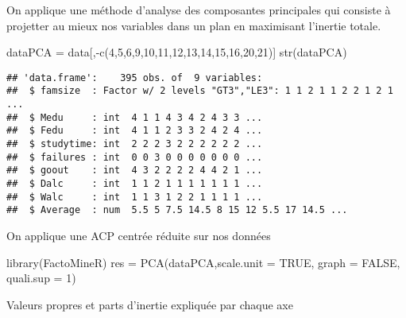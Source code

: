 \documentclass[
]{article}
\newenvironment{Shaded}{\begin{snugshade}}{\end{snugshade}}
\newcommand{\AttributeTok}[1]{\textcolor[rgb]{0.77,0.63,0.00}{#1}}
\newcommand{\ConstantTok}[1]{\textcolor[rgb]{0.00,0.00,0.00}{#1}}
\newcommand{\DecValTok}[1]{\textcolor[rgb]{0.00,0.00,0.81}{#1}}
\newcommand{\FunctionTok}[1]{\textcolor[rgb]{0.00,0.00,0.00}{#1}}
\newcommand{\NormalTok}[1]{#1}
\newcommand{\OtherTok}[1]{\textcolor[rgb]{0.56,0.35,0.01}{#1}}
\newcommand{\SpecialCharTok}[1]{\textcolor[rgb]{0.00,0.00,0.00}{#1}}
\begin{document}
On applique une méthode d'analyse des composantes principales qui
consiste à projetter au mieux nos variables dans un plan en maximisant
l'inertie totale.

\begin{Shaded}
\begin{Highlighting}[]
\NormalTok{dataPCA }\OtherTok{=}\NormalTok{ data[,}\SpecialCharTok{{-}}\FunctionTok{c}\NormalTok{(}\DecValTok{4}\NormalTok{,}\DecValTok{5}\NormalTok{,}\DecValTok{6}\NormalTok{,}\DecValTok{9}\NormalTok{,}\DecValTok{10}\NormalTok{,}\DecValTok{11}\NormalTok{,}\DecValTok{12}\NormalTok{,}\DecValTok{13}\NormalTok{,}\DecValTok{14}\NormalTok{,}\DecValTok{15}\NormalTok{,}\DecValTok{16}\NormalTok{,}\DecValTok{20}\NormalTok{,}\DecValTok{21}\NormalTok{)]}
\FunctionTok{str}\NormalTok{(dataPCA)}
\end{Highlighting}
\end{Shaded}

\begin{verbatim}
## 'data.frame':    395 obs. of  9 variables:
##  $ famsize  : Factor w/ 2 levels "GT3","LE3": 1 1 2 1 1 2 2 1 2 1 ...
##  $ Medu     : int  4 1 1 4 3 4 2 4 3 3 ...
##  $ Fedu     : int  4 1 1 2 3 3 2 4 2 4 ...
##  $ studytime: int  2 2 2 3 2 2 2 2 2 2 ...
##  $ failures : int  0 0 3 0 0 0 0 0 0 0 ...
##  $ goout    : int  4 3 2 2 2 2 4 4 2 1 ...
##  $ Dalc     : int  1 1 2 1 1 1 1 1 1 1 ...
##  $ Walc     : int  1 1 3 1 2 2 1 1 1 1 ...
##  $ Average  : num  5.5 5 7.5 14.5 8 15 12 5.5 17 14.5 ...
\end{verbatim}

On applique une ACP centrée réduite sur nos données

\begin{Shaded}
\begin{Highlighting}[]
\FunctionTok{library}\NormalTok{(FactoMineR)}
\NormalTok{res }\OtherTok{=} \FunctionTok{PCA}\NormalTok{(dataPCA,}\AttributeTok{scale.unit =} \ConstantTok{TRUE}\NormalTok{, }\AttributeTok{graph =} \ConstantTok{FALSE}\NormalTok{, }\AttributeTok{quali.sup =} \DecValTok{1}\NormalTok{) }
\end{Highlighting}
\end{Shaded}

Valeurs propres et parts d'inertie expliquée par chaque axe

\begin{Shaded}
\end{Shaded}
\end{document}
